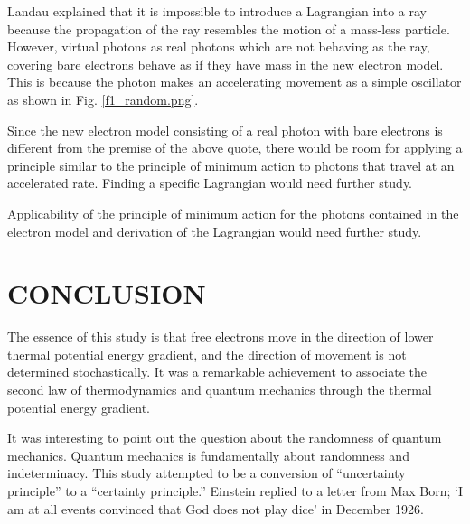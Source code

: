 \documentclass[reprint,amsmath,amssymb,aps,]{revtex4-1}
\numberwithin{equation}{section}%
\begin{document}
    Landau explained that it is impossible to introduce a Lagrangian into a ray because the propagation of the ray resembles the motion of a mass-less particle. However, virtual photons as real photons which are not behaving as the ray, covering bare electrons behave as if they have mass in the new electron model. This is because the photon makes an accelerating movement as a simple oscillator as shown in Fig. \ref{f1_random.png}.
    

    Since the new electron model consisting of a real photon with bare electrons is different from the premise of the above quote, there would be room for applying a principle similar to the principle of minimum action to photons that travel at an accelerated rate. Finding a specific Lagrangian would need further study.
    
    Applicability of the principle of minimum action for the photons contained in the electron model and derivation of the Lagrangian would need further study.
    


\section{\label{sec:CONCLUSION}CONCLUSION}


    The essence of this study is that free electrons move in the direction of lower thermal potential energy gradient, and the direction of movement is not determined stochastically. It was a remarkable achievement to associate the second law of thermodynamics and quantum mechanics through the thermal potential energy gradient.

    It was interesting to point out the question about the randomness of quantum mechanics. Quantum mechanics is fundamentally about randomness and indeterminacy. This study attempted to be a conversion of ``uncertainty principle'' to a ``certainty principle.''  Einstein replied to a letter from Max Born; `I am at all events convinced that God does not play dice' in December 1926. 
\end{document}
